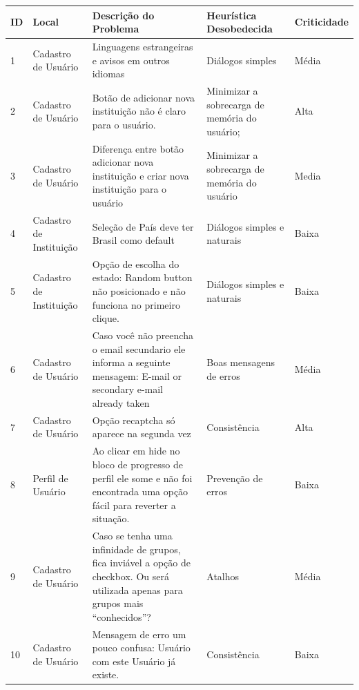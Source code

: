 \begin{table}[d]
\begin{tabular}{|l|p{3cm}|p{6cm}|p{3cm}|l|}
\hline
\textbf{ID} & \textbf{Local} & \textbf{Descrição do Problema}                                                                                     & \textbf{Heurística Desobedecida} & \textbf{Criticidade} \\ \hline
1           & Cadastro de Usuário                 & Linguagens estrangeiras e avisos em outros idiomas & Diálogos simples  & Média                \\ \hline
2           & Cadastro de Usuário      & Botão de adicionar nova instituição não é claro para o usuário.  & Minimizar a sobrecarga de memória do usuário;           & Alta                \\ \hline
3           & Cadastro de Usuário               & Diferença entre botão adicionar nova instituição e criar nova instituição para o usuário  & Minimizar a sobrecarga de memória do usuário & Media                \\ \hline
4           & Cadastro de Instituição             & Seleção de País deve ter Brasil como default  & Diálogos simples e naturais    & Baixa                \\ \hline
5           & Cadastro de Instituição      & Opção de escolha do estado: Random button não posicionado e não funciona no primeiro clique. & Diálogos simples e naturais  & Baixa                \\ \hline
6           & Cadastro de Usuário  & Caso você não preencha o email secundario ele informa a seguinte mensagem: E-mail or secondary e-mail already taken & Boas mensagens de erros                & Média                \\ \hline
7           & Cadastro de Usuário  & Opção recaptcha só aparece na segunda vez & Consistência                     & Alta                \\ \hline
8           & Perfil de Usuário  & Ao clicar em hide no bloco de progresso de perfil ele some e não foi encontrada uma opção fácil para reverter a situação.
 & Prevenção de erros                     & Baixa                \\ \hline
9           & Cadastro de Usuário  & Caso se tenha uma infinidade de grupos, fica inviável a opção de checkbox. Ou será utilizada apenas para grupos mais ``conhecidos''? & Atalhos & Média                \\ \hline
10           & Cadastro de Usuário  & Mensagem de erro um pouco confusa: Usuário com este Usuário já existe.  & Consistência                     & Baixa                \\ \hline
\end{tabular}
\end{table}

